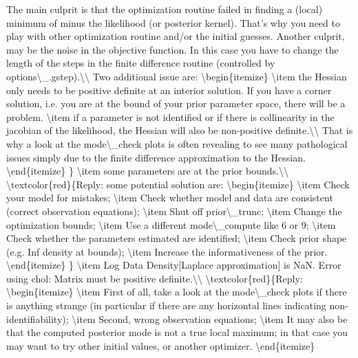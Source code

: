 \documentclass[10pt,math=newtx,citestyle=gb7714-2015,bibstyle=gb7714-2015]{elegantbook}
\begin{document}
	The main culprit is that the optimization routine failed in finding a (local) minimum of minus the likelihood (or posterior kernel). That's why you need to play with other optimization routine and/or the initial guesses. Another culprit, may be the noise in the objective function. In this case you have to change the length of the steps in the finite difference routine (controlled by options\textbackslash{}\_.gstep).\textbackslash{}\textbackslash{}
	Two additional issue are:
	\textbackslash{}begin\{itemize\}
	\textbackslash{}item the Hessian only needs to be positive definite at an interior solution. If you have a corner solution, i.e. you are at the bound of your prior parameter space, there will be a problem.
	\textbackslash{}item if a parameter is not identified or if there is collinearity in the jacobian of the likelihood, the Hessian will also be non-positive definite.\textbackslash{}\textbackslash{}
	That is why a look at the mode\textbackslash{}\_check plots is often revealing to see many pathological issues simply due to the finite difference approximation to the Hessian.
	\textbackslash{}end\{itemize\}
	\}
	\textbackslash{}item some parameters are at the prior bounds.\textbackslash{}\textbackslash{}
	\textbackslash{}textcolor\{red\}\{Reply: some potential solution are:
	\textbackslash{}begin\{itemize\}
	\textbackslash{}item Check your model for mistakes;
	\textbackslash{}item Check whether model and data are consistent (correct observation equations);
	\textbackslash{}item Shut off prior\textbackslash{}\_trunc;
	\textbackslash{}item Change the optimization bounds;
	\textbackslash{}item Use a different mode\textbackslash{}\_compute like 6 or 9;
	\textbackslash{}item Check whether the parameters estimated are identified;
	\textbackslash{}item Check prior shape (e.g. Inf density at bounds);
	\textbackslash{}item Increase the informativeness of the prior.
	\textbackslash{}end\{itemize\}
	\}
	\textbackslash{}item Log Data Density[Laplace approximation] is NaN. Error using chol: Matrix must be positive definite.\textbackslash{}\textbackslash{}
	\textbackslash{}textcolor\{red\}\{Reply:
	\textbackslash{}begin\{itemize\}
	\textbackslash{}item First of all, take a look at the mode\textbackslash{}\_check plots if there is anything strange (in particular if there are any horizontal lines indicating non-identifiability);
	\textbackslash{}item Second, wrong observation equations;
	\textbackslash{}item It may also be that the computed posterior mode is not a true local maximum; in that case you may want to try other initial values, or another optimizer.
	\textbackslash{}end\{itemize\}
\end{document}
